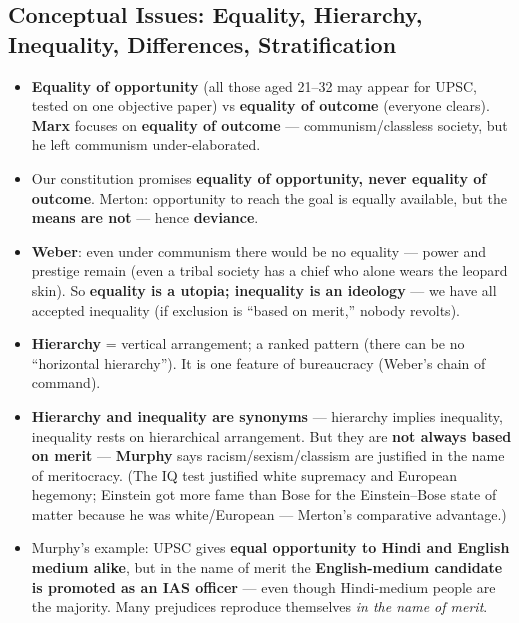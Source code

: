 \sectiondivider

\subsection{Conceptual Issues: Equality, Hierarchy, Inequality, Differences, Stratification}

\begin{KeyConcept}
\begin{itemize}
    \item \textbf{Equality of opportunity} (all those aged 21--32 may appear for UPSC, tested on one objective paper) vs \textbf{equality of outcome} (everyone clears). \textbf{Marx} focuses on \textbf{equality of outcome} --- communism/classless society, but he left communism under-elaborated.
    \item Our constitution promises \textbf{equality of opportunity, never equality of outcome}. Merton: opportunity to reach the goal is equally available, but the \textbf{means are not} --- hence \textbf{deviance}.
    \item \textbf{Weber}: even under communism there would be no equality --- power and prestige remain (even a tribal society has a chief who alone wears the leopard skin). So \textbf{equality is a utopia; inequality is an ideology} --- we have all accepted inequality (if exclusion is ``based on merit,'' nobody revolts).
\end{itemize}
\end{KeyConcept}

\begin{KeyConcept}
\begin{itemize}
    \item \textbf{Hierarchy} = vertical arrangement; a ranked pattern (there can be no ``horizontal hierarchy''). It is one feature of bureaucracy (Weber's chain of command).
    \item \textbf{Hierarchy and inequality are synonyms} --- hierarchy implies inequality, inequality rests on hierarchical arrangement. But they are \textbf{not always based on merit} --- \textbf{Murphy} says racism/sexism/classism are justified in the name of meritocracy. (The IQ test justified white supremacy and European hegemony; Einstein got more fame than Bose for the Einstein--Bose state of matter because he was white/European --- Merton's comparative advantage.)
    \item Murphy's example: UPSC gives \textbf{equal opportunity to Hindi and English medium alike}, but in the name of merit the \textbf{English-medium candidate is promoted as an IAS officer} --- even though Hindi-medium people are the majority. Many prejudices reproduce themselves \textit{in the name of merit}.
\end{itemize}
\end{KeyConcept}

